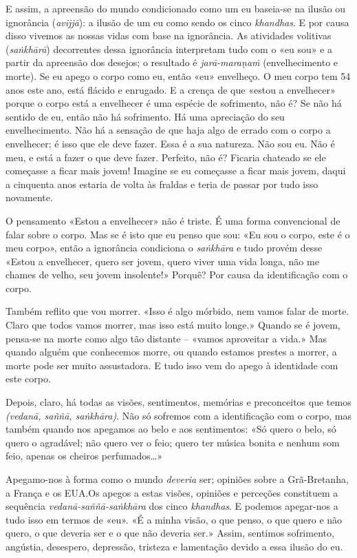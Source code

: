 E assim, a apreensão do mundo condicionado como um eu baseia-se na ilusão ou
ignorância (\emph{avijjā}): a ilusão de um eu como sendo os cinco
\emph{khandhas}. E por causa disso vivemos as nossas vidas com base na
ignorância. As atividades volitivas (\emph{saṅkhārā}) decorrentes dessa
ignorância interpretam tudo com o «eu sou» e a partir da apreensão dos desejos;
o resultado é \emph{jarā-maraṇaṁ} (envelhecimento e morte). Se eu apego o corpo
como eu, então «eu» envelheço. O meu corpo tem 54 anos este ano, está flácido e
enrugado. E a crença de que «estou a envelhecer» porque o corpo está a
envelhecer é uma espécie de sofrimento, não é? Se não há sentido de eu, então
não há sofrimento. Há uma apreciação do seu envelhecimento. Não há a sensação de
que haja algo de errado com o corpo a envelhecer; é isso que ele deve fazer.
Essa é a sua natureza. Não sou eu. Não é meu, e está a fazer o que deve fazer.
Perfeito, não é? Ficaria chateado se ele começasse a ficar mais jovem! Imagine
se eu começasse a ficar mais jovem, daqui a cinquenta anos estaria de volta às
fraldas e teria de passar por tudo isso novamente.

O pensamento «Estou a envelhecer» não é triste. É uma forma convencional de
falar sobre o corpo. Mas se é isto que eu penso que sou: «Eu sou o corpo, este é
o meu corpo», então a ignorância condiciona o \emph{saṅkhāra} e tudo provém
desse «Estou a envelhecer, quero ser jovem, quero viver uma vida longa, não me
chames de velho, seu jovem insolente!» Porquê? Por causa da identificação com o
corpo.

Também reflito que vou morrer. «Isso é algo mórbido, nem vamos falar de morte.
Claro que todos vamos morrer, mas isso está muito longe.» Quando se é jovem,
pensa-se na morte como algo tão distante -- «vamos aproveitar a vida.» Mas
quando alguém que conhecemos morre, ou quando estamos prestes a morrer, a morte
pode ser muito assustadora. E tudo isso vem do apego à identidade com este
corpo.

Depois, claro, há todas as visões, sentimentos, memórias e preconceitos que
temos \emph{(vedanā, saññā, saṅkhāra)}. Não só sofremos com a identificação com
o corpo, mas também quando nos apegamos ao belo e aos sentimentos: «Só quero o
belo, só quero o agradável; não quero ver o feio; quero ter música bonita e
nenhum som feio, apenas os cheiros perfumados\ldots{}»

Apegamo-nos à forma como o mundo \emph{deveria} ser; opiniões sobre a
Grã-Bretanha, a França e os EUA.\@ Os apegos a estas visões, opiniões e perceções
constituem a sequência \emph{vedanā-saññā-saṅkhāra} dos cinco \emph{khandhas}.
E podemos apegar-nos a tudo isso em termos de «eu». «É a minha visão, o que
penso, o que quero e não quero, o que deveria ser e o que não deveria ser.»
Assim, sentimos sofrimento, angústia, desespero, depressão, tristeza e
lamentação devido a essa ilusão do eu.

